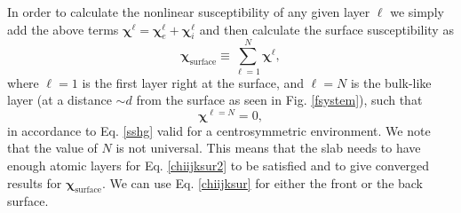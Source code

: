 In order to calculate the nonlinear susceptibility of any given layer 
$\ell$ we simply add the above terms $\boldsymbol{\chi}^{\ell}=
\boldsymbol{\chi}_{e}^{\ell} + \boldsymbol{\chi}_{i}^{\ell}$ and 
then calculate the surface susceptibility as 
\begin{equation}\label{chiijksur}
\boldsymbol{\chi}_{\mathrm{surface}} \equiv \sum_{\ell=1}^{N}\boldsymbol{\chi}^{\ell},
\end{equation} 
where $\ell=1$ is the first layer right at the surface, 
and $\ell=N$ is the bulk-like layer (at a distance $\sim d$ from the
surface  as seen in
Fig. \ref{fsystem}), such that 
\begin{equation}\label{chiijksur2}
\boldsymbol{\chi}^{\ell=N}=0,
\end{equation}
in accordance to Eq. \eqref{sshg} valid for a centrosymmetric environment. 
We note that the value of
$N$ is not universal.
This means that the slab needs to have enough atomic layers for 
Eq. \eqref{chiijksur2} 
to be satisfied and to give converged results for $\boldsymbol{\chi}_{\mathrm{surface}}$. 
We can use Eq. \eqref{chiijksur} for
either the front or the back surface.

